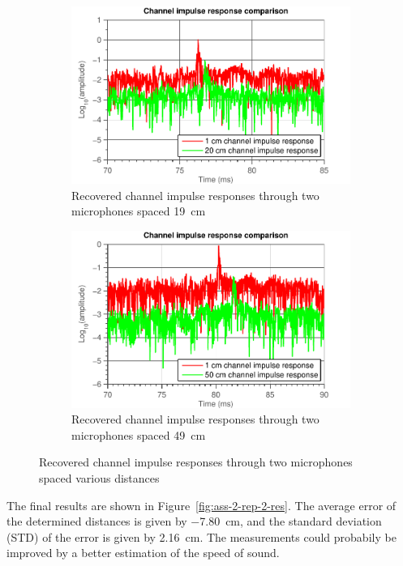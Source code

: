 \documentclass[11pt,titlepage]{report}
\begin{document}
\begin{figure}[H]
\begin{subfigure}{.49\textwidth}
		\includegraphics[width=\linewidth]{../../deliverable-7-resources/figures/ass-2/report-2-3/ass-2-report-2-impulse-responses-3.pdf}
		\caption{\centering Recovered channel impulse responses through two microphones spaced \SI{19}{cm}}
	\end{subfigure}
	\begin{subfigure}{.49\textwidth}
		\includegraphics[width=\linewidth]{../../deliverable-7-resources/figures/ass-2/report-2-3/ass-2-report-2-impulse-responses-4.pdf}
		\caption{\centering Recovered channel impulse responses through two microphones spaced \SI{49}{cm}}
	\end{subfigure}
	\caption{Recovered channel impulse responses through two microphones spaced various distances}
	\label{fig:ass-2-rep-2-imps}
\end{figure}

The final results are shown in Figure~\ref{fig:ass-2-rep-2-res}. The average error of the determined distances is given by \SI{-7.80}{cm}, and the standard deviation (STD) of the error is given by \SI{2.16}{cm}. The measurements could probabily be improved by a better estimation of the speed of sound.
\end{document}
